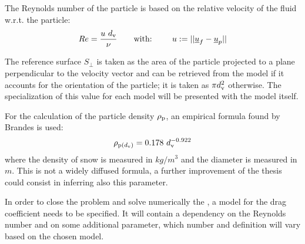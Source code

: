 	The Reynolds number of the particle is based on the relative velocity of the fluid w.r.t. the particle:
	\begin{equation}
		Re = \dfrac{u \ d_{\textup{v}}}{\nu} \qquad \text{with: } \qquad u := || \underline{u}_f - \underline{u}_p ||
	\end{equation}
	
	The reference surface $ S_{\perp} $ is taken as the area of the particle projected to a plane perpendicular to the velocity vector and can be retrieved from the model if it accounts for the orientation of the particle; it is taken as $ \pi d_{\textup{v}}^2 $ otherwise. The specialization of this value for each model will be presented with the model itself.
	
	
	For the calculation of the particle density $ \rho_{\textup{p}} $, an empirical formula found by Brandes \cite{Brandes-2008} is used:
	\begin{equation}
		\rho_{\textup{p}(\dv)} = 0.178\ \dv^{-0.922}
	\end{equation}
	where the density of snow is measured in $ kg / m^3 $ and the diameter is measured in $ m $. This is not a widely diffused formula, a further improvement of the thesis could consist in inferring also this parameter.
	
	In order to close the problem and solve numerically the , a model for the drag coefficient needs to be specified. It will contain a dependency on the Reynolds number and on some additional parameter, which number and definition will vary based on the chosen model. 
	
